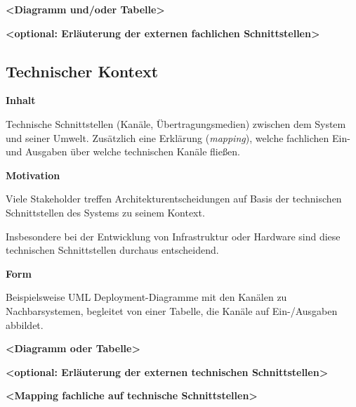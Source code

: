 \textbf{\textless Diagramm und/oder Tabelle\textgreater{}}

\textbf{\textless optional: Erläuterung der externen fachlichen
Schnittstellen\textgreater{}}

\hypertarget{technischer-kontext}{%
\subsection{Technischer Kontext}\label{technischer-kontext}}

\textbf{Inhalt}

Technische Schnittstellen (Kanäle, Übertragungsmedien) zwischen dem
System und seiner Umwelt. Zusätzlich eine Erklärung (\emph{mapping}),
welche fachlichen Ein- und Ausgaben über welche technischen Kanäle
fließen.

\textbf{Motivation}

Viele Stakeholder treffen Architekturentscheidungen auf Basis der
technischen Schnittstellen des Systems zu seinem Kontext.

Insbesondere bei der Entwicklung von Infrastruktur oder Hardware sind
diese technischen Schnittstellen durchaus entscheidend.

\textbf{Form}

Beispielsweise UML Deployment-Diagramme mit den Kanälen zu
Nachbarsystemen, begleitet von einer Tabelle, die Kanäle auf
Ein-/Ausgaben abbildet.

\textbf{\textless Diagramm oder Tabelle\textgreater{}}

\textbf{\textless optional: Erläuterung der externen technischen
Schnittstellen\textgreater{}}

\textbf{\textless Mapping fachliche auf technische
Schnittstellen\textgreater{}}
